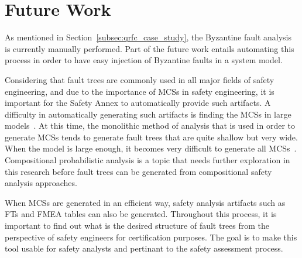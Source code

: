 \section{Future Work}
\label{sec:future_work}
As mentioned in Section~\ref{subsec:qrfc_case_study}, the Byzantine fault analysis is currently manually performed. Part of the future work entails automating this process in order to have easy injection of Byzantine faults in a system model. 

Considering that fault trees are commonly used in all major fields of safety engineering, and due to the importance of MCSs in safety engineering, it is important for the Safety Annex to automatically provide such artifacts. A difficulty in automatically generating such artifacts is finding the MCSs in large models~\cite{CAV2015:BoCiGrMa, 10.1007/978-3-540-75596-8-13,0f356f05e72f43018211b36f97c8854a}. At this time, the monolithic method of analysis that is used in order to generate MCSs tends to generate fault trees that are quite shallow but very wide. When the model is large enough, it becomes very difficult to generate all MCSs~\cite{mattarei}. Compositional probabilistic analysis is a topic that needs further exploration in this research before fault trees can be generated from compositional safety analysis approaches. 

When MCSs are generated in an efficient way, safety analysis artifacts such as FTs and FMEA tables can also be generated. Throughout this process, it is important to find out what is the desired structure of fault trees from the perspective of safety engineers for certification purposes. The goal is to make this tool usable for safety analysts and pertinant to the safety assessment process.

